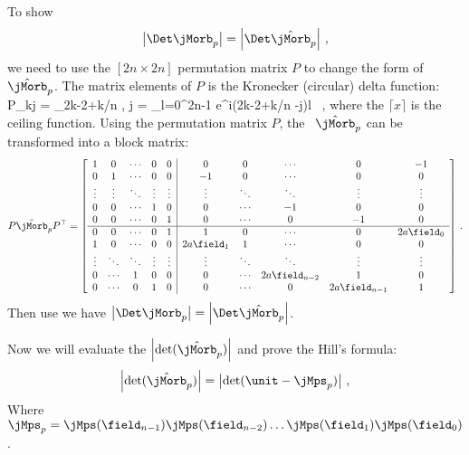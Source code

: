 To show
\[
\left|\Det\jMorb_p\right| = \left|\Det \hat{\jMorb}_p \right| \, ,
\]
we need to use the $[2n \times 2n]$ permutation matrix $P$ to change the form
of $\hat{\jMorb}_p$. The matrix elements of
$P$ is the Kronecker (circular) delta function:
\bea
P_{kj} = \delta_{2k-2+\lceil k/n \rceil, j}
=  \sum_{l=0}^{2n-1} e^{i(2k-2+\lceil k/n \rceil-j)l} \, ,
\label{HLHillDetPermutation}
\eea
where the $\lceil x \rceil$ is the ceiling function.
Using the permutation matrix $P$, the \jacobianOrb\ $\hat{\jMorb}_p$ can be transformed
into a block matrix:
\[
P \hat{\jMorb}_p P^\top =
\left[
\begin{array}{ccccc|ccccc}
 1 & 0 & \cdots & 0 & 0 & 0 & 0 & \cdots & 0 & -1 \\
 0 & 1 & \cdots & 0 & 0 & -1 & 0 & \cdots & 0 & 0 \\
 \vdots & \vdots & \ddots & \vdots & \vdots & \vdots & \ddots & \ddots & \vdots & \vdots \\
 0 & 0 & \cdots & 1 & 0 & 0 & \cdots & -1 & 0 & 0 \\
 0 & 0 & \cdots & 0 & 1 & 0 & \cdots & 0 & -1 & 0 \\ \hline
 0 & 0 & \cdots & 0 & 1 & 1 & 0 & \cdots & 0 & 2 a \field_0 \\
 1 & 0 & \cdots & 0 & 0 & 2 a \field_1 & 1 & \cdots & 0 & 0 \\
 \vdots & \ddots & \ddots & \vdots & \vdots & \vdots & \ddots & \ddots & \vdots & \vdots \\
 0 & \cdots & 1 & 0 & 0 & 0 & \cdots & 2 a \field_{n-2} & 1 & 0 \\
 0 & \cdots & 0 & 1 & 0 & 0 & \cdots & 0 & 2 a \field_{n-1} & 1 \\
\end{array}
\right] \, .
\]
Then use  we have $\left|\Det\jMorb_p\right| = \left|\Det\hat{\jMorb}_p\right|$.

Now we will evaluate the {\HillDet} $\left|\det(\hat{\jMorb}_p)\right|$ and prove the Hill's
formula:
\[
\left|\det(\hat{\jMorb}_p)\right|
=
\left|\det(\unit-\jMps_p)\right| \, ,
\]
Where $\jMps_p = \jMps(\field_{n-1})\jMps(\field_{n-2})\dots\jMps(\field_{1})\jMps(\field_{0})$.


